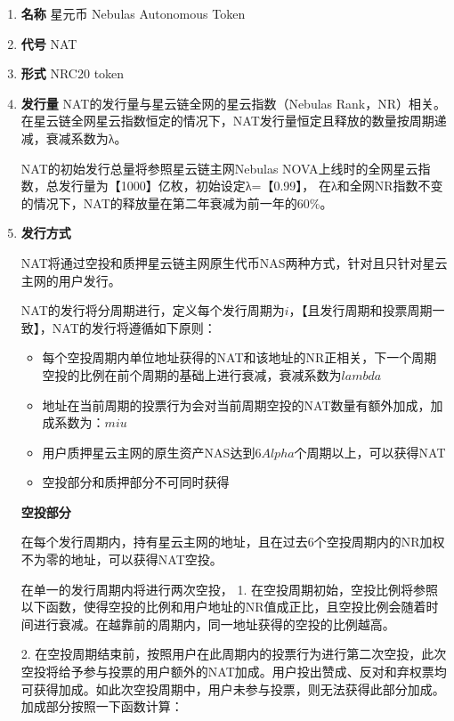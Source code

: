 \begin{enumerate}
	\item \textbf{名称}
		星元币 Nebulas Autonomous Token
		
	\item \textbf{代号}
	NAT

	\item  \textbf{形式}
	NRC20 token

	\item \textbf{发行量}
	NAT的发行量与星云链全网的星云指数（Nebulas Rank，NR）相关。在星云链全网星云指数恒定的情况下，NAT发行量恒定且释放的数量按周期递减，衰减系数为λ。
	
	NAT的初始发行总量将参照星云链主网Nebulas NOVA上线时的全网星云指数，总发行量为【1000】亿枚，初始设定λ=【0.99】， 在λ和全网NR指数不变的情况下，NAT的释放量在第二年衰减为前一年的60\%。  


	\item \textbf{发行方式}
	
	NAT将通过空投和质押星云链主网原生代币NAS两种方式，针对且只针对星云主网的用户发行。
	
	NAT的发行将分周期进行，定义每个发行周期为$i$，【且发行周期和投票周期一致】，NAT的发行将遵循如下原则：

		\begin{itemize}
			\item 每个空投周期内单位地址获得的NAT和该地址的NR正相关，下一个周期空投的比例在前个周期的基础上进行衰减，衰减系数为$lambda$
			\item 地址在当前周期的投票行为会对当前周期空投的NAT数量有额外加成，加成系数为：$miu$
			\item 用户质押星云主网的原生资产NAS达到6$Alpha$个周期以上，可以获得NAT
			\item 空投部分和质押部分不可同时获得
		\end{itemize}

\textbf{空投部分}

在每个发行周期内，持有星云主网的地址，且在过去6个空投周期内的NR加权不为零的地址，可以获得NAT空投。

在单一的发行周期内将进行两次空投，
1. 在空投周期初始，空投比例将参照以下函数，使得空投的比例和用户地址的NR值成正比，且空投比例会随着时间进行衰减。在越靠前的周期内，同一地址获得的空投的比例越高。

2. 在空投周期结束前，按照用户在此周期内的投票行为进行第二次空投，此次空投将给予参与投票的用户额外的NAT加成。用户投出赞成、反对和弃权票均可获得加成。如此次空投周期中，用户未参与投票，则无法获得此部分加成。加成部分按照一下函数计算：


\end{enumerate}
